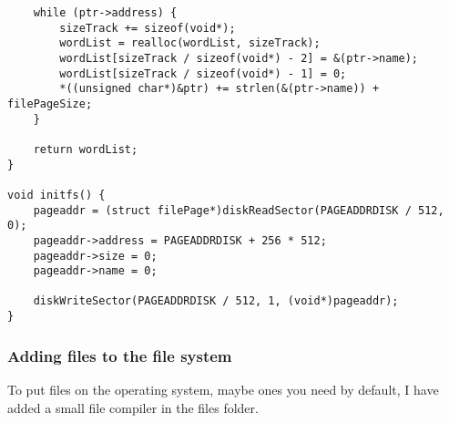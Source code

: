 \documentclass{article}
\begin{document}
\begin{verbatim}
	while (ptr->address) {
		sizeTrack += sizeof(void*);
		wordList = realloc(wordList, sizeTrack);
		wordList[sizeTrack / sizeof(void*) - 2] = &(ptr->name);
		wordList[sizeTrack / sizeof(void*) - 1] = 0;
		*((unsigned char*)&ptr) += strlen(&(ptr->name)) + filePageSize;
	}

	return wordList;
}

void initfs() {
	pageaddr = (struct filePage*)diskReadSector(PAGEADDRDISK / 512, 0);
	pageaddr->address = PAGEADDRDISK + 256 * 512;
	pageaddr->size = 0;
	pageaddr->name = 0;

	diskWriteSector(PAGEADDRDISK / 512, 1, (void*)pageaddr);
}
\end{verbatim}

\subsubsection{Adding files to the file system}

To put files on the operating system, maybe ones you need by default, I
have added a small file compiler in the files folder.
\end{document}
